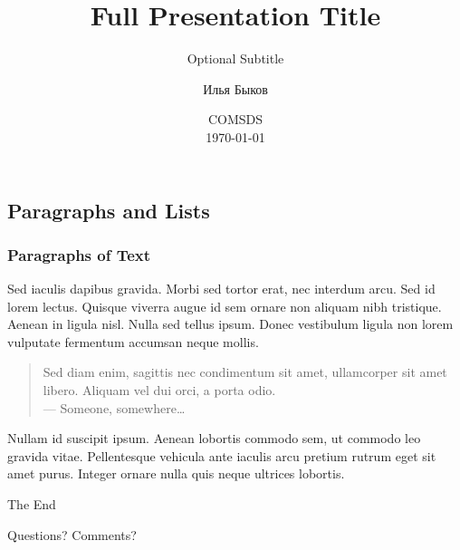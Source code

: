 \documentclass{beamer}
\title[Short Title]{Full Presentation Title} %
\subtitle{Optional Subtitle} %
\author[Илья Быков]{Илья Быков} %
\institute[SPBGU]{Saint Petersburg State Universitye \\ \smallskip \textit{i.bykov@spbu.ru}} %
\date[\today]{COMSDS \\ \today} %
\begin{document}

\begin{frame}
	\titlepage %
\end{frame}


\subsection{Paragraphs and Lists}

\begin{frame}
	\frametitle{Paragraphs of Text}
	
	Sed iaculis \alert{dapibus gravida}. Morbi sed tortor erat, nec interdum arcu. Sed id lorem lectus. Quisque viverra augue id sem ornare non aliquam nibh tristique. Aenean in ligula nisl. Nulla sed tellus ipsum. Donec vestibulum ligula non lorem vulputate fermentum accumsan neque mollis.
	
	\bigskip %
	
	\begin{quote}
		Sed diam enim, sagittis nec condimentum sit amet, ullamcorper sit amet libero. Aliquam vel dui orci, a porta odio.\\
		--- Someone, somewhere\ldots
	\end{quote}
	
	\bigskip %
	
	Nullam id suscipit ipsum. Aenean lobortis commodo sem, ut commodo leo gravida vitae. Pellentesque vehicula ante iaculis arcu pretium rutrum eget sit amet purus. Integer ornare nulla quis neque ultrices lobortis.
\end{frame}


\begin{frame}[plain] %
	\begin{center}
		{\Huge The End}

		\bigskip\bigskip %
		
		{\LARGE Questions? Comments?}
	\end{center}
\end{frame}
\end{document}

